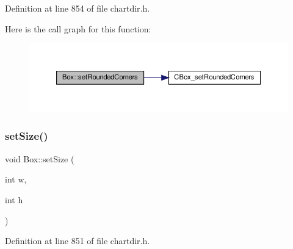 Definition at line 854 of file chartdir.\+h.

Here is the call graph for this function\+:
\nopagebreak
\begin{figure}[H]
\begin{center}
\leavevmode
\includegraphics[width=350pt]{class_box_a6b95c4540afd7f1493742169c01aa0a6_cgraph}
\end{center}
\end{figure}
\mbox{\label{class_box_a2ec3e1cb522c938cf6927fcb41389bc3}} 
\subsubsection{\texorpdfstring{set\+Size()}{setSize()}}
{\footnotesize\ttfamily void Box\+::set\+Size (\begin{DoxyParamCaption}\item[{int}]{w,  }\item[{int}]{h }\end{DoxyParamCaption})\hspace{0.3cm}{\ttfamily [inline]}}



Definition at line 851 of file chartdir.\+h.

